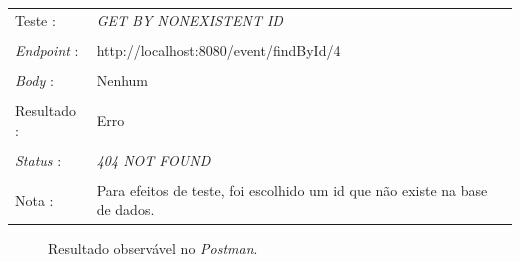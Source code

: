 \begin{tabular}{ll}
	Teste : & \emph{GET BY NONEXISTENT ID}\\
	\\
	\emph{Endpoint} : & http://localhost:8080/event/findById/4\\
	\\
	\emph{Body} : & Nenhum\\
	\\
	Resultado : & Erro\\
	\\
	\emph{Status} : & \emph{404 NOT FOUND}\\
	\\
	Nota : & Para efeitos de teste, foi escolhido um id que não existe na base de dados.\\
\end{tabular}

\begin{figure}[h]
	\begin{center}
	\end{center}
	\caption{Resultado observável no \emph{Postman}.}\label{fig:eventfindbyid404}
\end{figure}
\newpage

